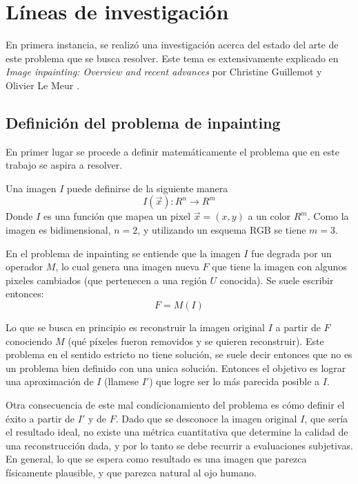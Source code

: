 \documentclass[assd_tpf_main.tex]{subfiles}
\begin{document}
\section{L\'ineas de investigaci\'on}

En primera instancia, se realiz\'o una investigaci\'on acerca 
del estado del arte de este problema que se busca resolver.
Este tema es extensivamente explicado en \textit{Image inpainting: Overview and recent advances} por Christine Guillemot y Olivier Le Meur \cite{b3}.

\subsection{Definici\'on del problema de inpainting}

En primer lugar se procede a definir matemáticamente el problema que en este trabajo se aspira a resolver. 

Una imagen $I$ puede definirse de la siguiente manera
\begin{equation}
I(\vec x): R^{n} \to R^{m}
\end{equation}
Donde $I$ es una función que mapea un pixel $\vec x=(x,y)$ a un color $R^{m}$. Como la imagen es bidimensional, $n=2$, y utilizando un esquema RGB se tiene $m=3$.

En el problema de inpainting se entiende que la imagen $I$ fue degrada por un operador $M$, lo cual genera una imagen nueva $F$ que tiene la imagen con algunos pixeles cambiados (que pertenecen a una región $U$ conocida). Se suele escribir entonces:
\begin{equation}
F=M(I)
\end{equation}

Lo que se busca en principio es reconstruir la imagen original $I$ a partir de $F$ conociendo $M$ (qu\'e p\'ixeles fueron removidos y se quieren reconstruir). Este problema en el sentido estricto no tiene solución, se suele decir entonces que no es un problema bien definido con una unica solución.
Entonces el objetivo es lograr una aproximación de $I$ (llamese $I'$) que logre ser lo más parecida posible a $I$.

Otra consecuencia de este mal condicionamiento del problema es c\'omo definir el \'exito a partir de $I'$ y de $F$. Dado que se desconoce la imagen original $I$, que ser\'ia el resultado ideal, no existe una m\'etrica cuantitativa que determine la calidad de una reconstrucci\'on dada, y por lo tanto se debe recurrir a evaluaciones subjetivas. En general, lo que se espera como resultado es una imagen que parezca f\'isicamente plausible, y que parezca natural al ojo humano.
\end{document}
